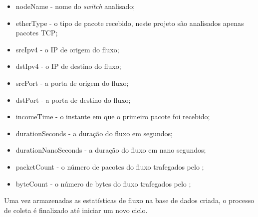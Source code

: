 \begin{itemize}
    \item nodeName - nome do \textit{switch} analisado;
    \item etherType - o tipo de pacote recebido, neste projeto são analisados apenas pacotes TCP;
    \item srcIpv4 - o IP de origem do fluxo;
    \item dstIpv4 - o IP de destino do fluxo;
    \item srcPort - a porta de origem do fluxo;
    \item dstPort - a porta de destino do fluxo;
    \item incomeTime - o instante em que o primeiro pacote foi recebido;
    \item durationSeconds - a duração do fluxo em segundos;
    \item durationNanoSeconds - a duração do fluxo em nano segundos;
    \item packetCount - o número de pacotes do fluxo trafegados pelo ;
    \item byteCount - o número de bytes do fluxo trafegados pelo ;
\end{itemize}

Uma vez armazenadas as estatísticas de fluxo na base de dados criada, o processo de coleta é finalizado até iniciar um novo ciclo.